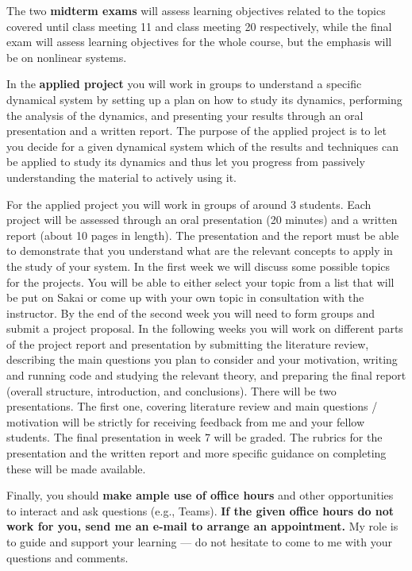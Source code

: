 \documentclass[11pt]{article}
\begin{document}
The two \textbf{midterm exams} will assess learning objectives related to the topics covered until class meeting 11 and class meeting 20 respectively, while the final exam will assess learning objectives for the whole course, but the emphasis will be on nonlinear systems.

In the \textbf{applied project} you will work in groups to understand a specific dynamical system by setting up a plan on how to study its dynamics, performing the analysis of the dynamics, and presenting your results through an oral presentation and a written report. The purpose of the applied project is to let you decide for a given dynamical system which of the results and techniques can be applied to study its dynamics and thus let you progress from passively understanding the material to actively using it. 

For the applied project you will work in groups of around 3 students. Each project will be assessed through an oral presentation (20 minutes) and a written report (about 10 pages in length). The presentation and the report must be able to demonstrate that you understand what are the relevant concepts to apply in the study of your system.  In the first week we will discuss some possible topics for the projects. You will be able to either select your topic from a list that will be put on Sakai or come up with your own topic in consultation with the instructor. By the end of the second week you will need to form groups and submit a project proposal. In the following weeks you will work on different parts of the project report and presentation by submitting the literature review, describing the main questions you plan to consider and your motivation, writing and running code and studying the relevant theory, and preparing the final report (overall structure, introduction, and conclusions). There will be two presentations. The first one, covering literature review and main questions / motivation will be strictly for receiving feedback from me and your fellow students. The final presentation in week 7 will be graded. The rubrics for the presentation and the written report and more specific guidance on completing these will be made available.

Finally, you should \textbf{make ample use of office hours} and other opportunities to interact and ask questions (e.g., Teams). \textbf{If the given office hours do not work for you, send me an e-mail to arrange an appointment.} My role is to guide and support your learning — do not hesitate to come to me with your questions and comments.
\end{document}
